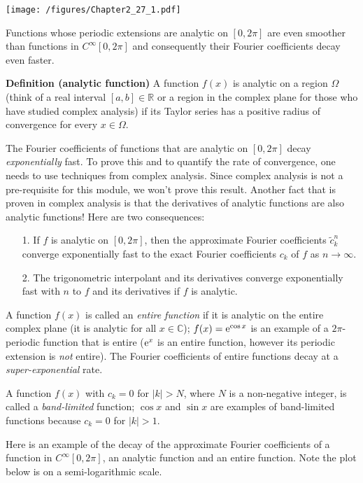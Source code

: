 \documentclass[12pt,landscape]{article}
\begin{document}
{\texttt{[image: /figures/Chapter2\_27\_1.pdf]}

Functions whose periodic extensions  are analytic on $[0, 2\pi]$ are even smoother than functions in $C^{\infty}[0, 2\pi]$ and consequently their Fourier coefficients decay even faster.

\textbf{Definition (analytic function)} A function $f(x)$ is analytic on a region $\Omega$ (think of a real interval $[a, b] \in \mathbb{R}$ or a region in the complex plane for those who have studied complex analysis) if its Taylor series has a positive radius of convergence for every $x \in \Omega$.

The Fourier coefficients of functions that are analytic on $[0, 2\pi]$ decay \emph{exponentially} fast.  To prove this and to quantify the rate of convergence, one needs to use techniques from complex analysis.  Since complex analysis is not a pre-requisite for this module, we won't prove this result.  Another fact that is proven in complex analysis is that the derivatives of analytic functions are also analytic functions! Here are two consequences:

\begin{itemize}
\item[1. ] If $f$ is analytic on $[0, 2\pi]$, then the approximate Fourier coefficients $\tilde{c}^n_k$ converge exponentially fast to the exact Fourier coefficients $c_k$ of $f$ as $n \to \infty$.   


\item[2. ] The trigonometric interpolant and its derivatives converge exponentially fast with $n$ to $f$ and its derivatives if $f$ is analytic.

\end{itemize}
A function $f(x)$ is called an \emph{entire function} if it is analytic on the entire complex plane (it is analytic for all $x \in \mathbb{C}$); $f(x) = {\rm e}^{\cos x}$ is an example of a $2\pi$-periodic function that is entire (${\rm e}^{x}$ is an entire function, however its periodic extension is \emph{not} entire). The Fourier coefficients of entire functions decay at a \emph{super-exponential} rate.

A function $f(x)$ with $c_{k} = 0$ for $\vert k \vert > N$, where $N$ is a non-negative integer, is called a \emph{band-limited} function; $\cos x$ and $\sin x$ are examples of band-limited functions because $c_{k} = 0$ for $\vert k \vert > 1$.

Here is an example of the decay of the approximate Fourier coefficients of a function in $C^{\infty}[0, 2\pi]$, an analytic function and an entire function. Note the plot below is on a semi-logarithmic scale.


}
\end{document}
